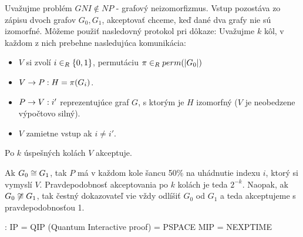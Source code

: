\begin{priklad}
    Uvažujme problém $GNI \not \in NP$ - grafový neizomorfizmus.
    Vstup pozostáva zo zápisu dvoch grafov $G_0, G_1$, akceptovať chceme, keď
    dané dva grafy nie sú izomorfné. Môžeme použiť nasledovný protokol
    pri dôkaze: Uvažujme $k$ kôl, v každom z nich prebehne nasledujúca
    komunikácia:
    \begin{itemize}
        \item $V$ si zvolí $i \in_{R} \{0,1\}$, permutáciu
         $\pi \in_{R} perm(|G_0|)$
        \item $V \rightarrow P: H = \pi(G_i)$.
        \item $P \rightarrow V: i'$ reprezentujúce graf $G$, s ktorým je $H$
        izomorfný ($V$ je neobedzene výpočtovo silný).
        \item $V$ zamietne vstup ak $i \not = i'$.
    \end{itemize}
    Po $k$ úspešných kolách $V$ akceptuje.

    Ak $G_0 \cong G_1$, tak $P$ má v každom kole šancu 50\% na
    uhádnutie indexu $i$, ktorý si vymyslí $V$. 
    Pravdepodobnosť akceptovania po $k$ kolách je teda $2^{-k}$.
    Naopak, ak $G_0 \not \cong G_1$, tak čestný dokazovateľ vie
    vždy odlíšiť $G_0$ od $G_1$ a teda akceptujeme s pravdepodobnosťou 1.
\end{priklad}

:
IP = QIP (Quantum Interactive proof) = PSPACE
MIP = NEXPTIME

